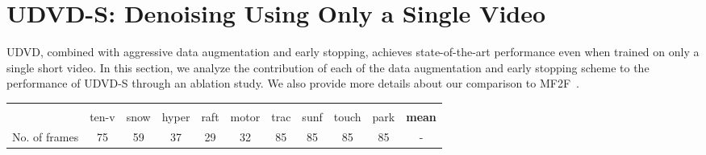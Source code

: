 \documentclass[final]{cvpr}
\begin{document}
\section{UDVD-S: Denoising Using Only a Single Video}
\label{sec:single_video}

UDVD, combined with aggressive data augmentation and early stopping, achieves state-of-the-art performance even when trained on only a single short video. In this section, we analyze the contribution of each of the data augmentation and early stopping scheme to the performance of UDVD-S through an ablation study. We also provide more details about our comparison to MF2F~\cite{mf2f}. 




\begin{table*}[t]
    \centering
    \footnotesize{
    \begin{tabular}{lcccccccccc}
        \toprule
        
        \multicolumn{1}{l}{\phantom} &
        \multicolumn{10}{c}{} \\
        \cmidrule(lr){2-11}
        &
        \multicolumn{1}{c}{ten-v} &
        \multicolumn{1}{c}{snow} & 
        \multicolumn{1}{c}{hyper} & 
        \multicolumn{1}{c}{raft} &
        \multicolumn{1}{c}{motor} &
        \multicolumn{1}{c}{trac} &
        \multicolumn{1}{c}{sunf} &
        \multicolumn{1}{c}{touch} &
        \multicolumn{1}{c}{park} &
        \multicolumn{1}{c}{\textbf{mean}} \\
        
        \midrule
        No. of frames &
        \multicolumn{1}{c}{75} &
        \multicolumn{1}{c}{59} &
        \multicolumn{1}{c}{37} & 
        \multicolumn{1}{c}{29} &
        \multicolumn{1}{c}{32} &
        \multicolumn{1}{c}{85} &
        \multicolumn{1}{c}{85} &
        \multicolumn{1}{c}{85} &
        \multicolumn{1}{c}{85} &
        \multicolumn{1}{c}{-} \\
        
        \midrule
        

\end{tabular}}
\end{table*}
\end{document}
